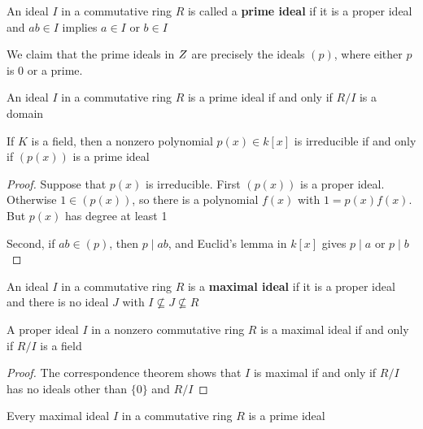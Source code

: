 \documentclass[11pt]{article}
\begin{document}
\begin{definition}[]
An ideal \(I\) in a commutative ring \(R\) is called a \textbf{prime ideal} if it is a
proper ideal and \(ab\in I\) implies \(a\in I\) or \(b\in I\)
\end{definition}

\begin{examplle}[]
We claim that the prime ideals in \(\relax{Z}\) are precisely the ideals \((p)\),
where either \(p\) is 0 or a prime.
\end{examplle}

\begin{proposition}[]
An ideal \(I\) in a commutative ring \(R\) is a prime ideal if and only if
\(R/I\) is a domain
\end{proposition}

\begin{proposition}[]
If \(K\) is a field, then a nonzero polynomial \(p(x)\in k[x]\) is irreducible
if and only if \((p(x))\) is a prime ideal
\end{proposition}

\begin{proof}
Suppose that \(p(x)\) is irreducible. First \((p(x))\) is a proper ideal.
Otherwise \(1\in (p(x))\), so there is a polynomial \(f(x)\) with
\(1=p(x)f(x)\). But \(p(x)\) has degree at least 1

Second, if \(ab\in(p)\), then \(p\mid ab\), and Euclid's lemma in \(k[x]\)
gives \(p\mid a\) or \(p\mid b\)
\end{proof}

\begin{definition}[]
An ideal \(I\) in a commutative ring \(R\) is a \textbf{maximal ideal} if it is a proper
ideal and there is no ideal \(J\) with \(I\not\subseteq J\not\subseteq R\)
\end{definition}

\begin{proposition}[]
A proper ideal \(I\) in a nonzero commutative ring \(R\) is a maximal ideal if
and only if \(R/I\) is a field
\end{proposition}

\begin{proof}
The correspondence theorem shows that \(I\) is maximal if and only if \(R/I\)
has no ideals other than \(\{0\}\) and \(R/I\)
\end{proof}

\begin{corollary}[]
\label{cor6.8}
Every maximal ideal \(I\) in a commutative ring \(R\) is a prime ideal
\end{corollary}
\end{document}
